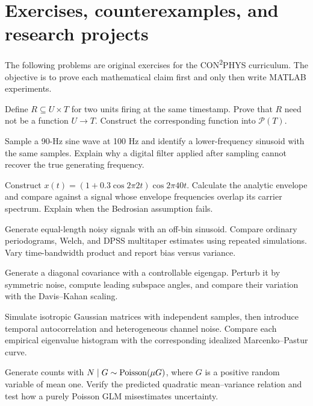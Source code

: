 \chapter{Exercises, counterexamples, and research projects}
The following problems are original exercises for the CON\textsuperscript{2}PHYS
curriculum. The objective is to prove each mathematical claim first
and only then write MATLAB experiments.

\begin{exercise}
Define $R\subseteq U\times T$ for two units firing at the same
timestamp. Prove that $R$ need not be a function $U\to T$.
Construct the corresponding function into $\mathcal P(T)$.
\end{exercise}
\begin{exercise}
Sample a 90-Hz sine wave at 100 Hz and identify a lower-frequency
sinusoid with the same samples. Explain why a digital filter applied
after sampling cannot recover the true generating frequency.
\end{exercise}
\begin{exercise}
Construct $x(t)=(1+0.3\cos 2\pi 2t)\cos 2\pi 40t$.
Calculate the analytic envelope and compare against a signal
whose envelope frequencies overlap its carrier spectrum.
Explain when the Bedrosian assumption fails.
\end{exercise}
\begin{exercise}
Generate equal-length noisy signals with an off-bin sinusoid.
Compare ordinary periodograms, Welch, and DPSS multitaper
estimates using repeated simulations. Vary time-bandwidth
product and report bias versus variance.
\end{exercise}
\begin{exercise}
Generate a diagonal covariance with a controllable eigengap.
Perturb it by symmetric noise, compute leading subspace angles,
and compare their variation with the Davis--Kahan scaling.
\end{exercise}
\begin{exercise}
Simulate isotropic Gaussian matrices with independent samples,
then introduce temporal autocorrelation and heterogeneous
channel noise. Compare each empirical eigenvalue histogram with
the corresponding idealized Marcenko--Pastur curve.
\end{exercise}
\begin{exercise}
Generate counts with $N\mid G\sim\operatorname{Poisson}(\mu G)$, where
$G$ is a positive random variable of mean one.
Verify the predicted quadratic mean--variance relation and
test how a purely Poisson GLM misestimates uncertainty.
\end{exercise}
